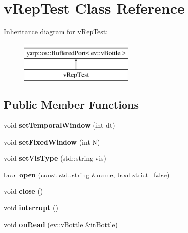 \hypertarget{classvRepTest}{}\section{v\+Rep\+Test Class Reference}
\label{classvRepTest}
Inheritance diagram for v\+Rep\+Test\+:\begin{figure}[H]
\begin{center}
\leavevmode
\includegraphics[height=2.000000cm]{classvRepTest}
\end{center}
\end{figure}
\subsection*{Public Member Functions}
\begin{DoxyCompactItemize}
\item 
void {\bfseries set\+Temporal\+Window} (int dt)\hypertarget{classvRepTest_afc9888397eba6894a65302b0226d81f0}{}\label{classvRepTest_afc9888397eba6894a65302b0226d81f0}

\item 
void {\bfseries set\+Fixed\+Window} (int N)\hypertarget{classvRepTest_a72524b413a72d7a56f48e1a4f2021177}{}\label{classvRepTest_a72524b413a72d7a56f48e1a4f2021177}

\item 
void {\bfseries set\+Vis\+Type} (std\+::string vis)\hypertarget{classvRepTest_aa616d24c44c0f452a42f4b02e4395967}{}\label{classvRepTest_aa616d24c44c0f452a42f4b02e4395967}

\item 
bool {\bfseries open} (const std\+::string \&name, bool strict=false)\hypertarget{classvRepTest_a02ae7ad9d91210b42178b45e3b0a7d68}{}\label{classvRepTest_a02ae7ad9d91210b42178b45e3b0a7d68}

\item 
void {\bfseries close} ()\hypertarget{classvRepTest_a95d46a88b378bb620c4ee3c0e1c7f32a}{}\label{classvRepTest_a95d46a88b378bb620c4ee3c0e1c7f32a}

\item 
void {\bfseries interrupt} ()\hypertarget{classvRepTest_aed45d04a505f13efba3cfc64bc59d795}{}\label{classvRepTest_aed45d04a505f13efba3cfc64bc59d795}

\item 
void {\bfseries on\+Read} (\hyperlink{classev_1_1vBottle}{ev\+::v\+Bottle} \&in\+Bottle)\hypertarget{classvRepTest_aea8bca9d38eed370dd7969063d93d229}{}\label{classvRepTest_aea8bca9d38eed370dd7969063d93d229}

\end{DoxyCompactItemize}


